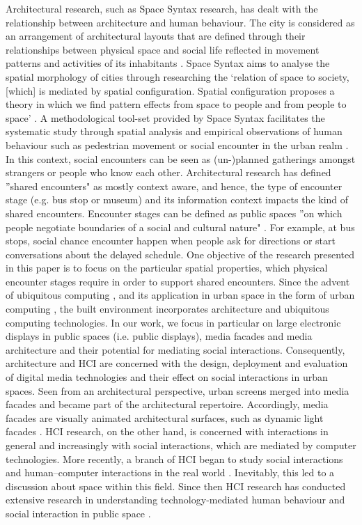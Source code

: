 Architectural research, such as Space Syntax research, has dealt with the relationship
between architecture and human behaviour. The city is considered as an
arrangement of architectural layouts that are defined through their relationships
between physical space and social life reflected in movement patterns and activities
of its inhabitants \cite{Hillier1984}. Space Syntax aims to analyse
the spatial morphology of cities through researching the ‘relation of space to society,
[which] is mediated by spatial configuration. Spatial configuration proposes
a theory in which we find pattern effects from space to people and from people
to space’ \cite{Hillier1998}. A methodological tool-set provided by Space
Syntax facilitates the systematic study through spatial analysis and empirical
observations of human behaviour such as pedestrian movement or social encounter
in the urban realm \cite{AlSayed2013}. In this context, social encounters
can be seen as (un-)planned gatherings amongst strangers or people who know
each other. Architectural research has defined ''shared encounters" as mostly context
aware, and hence, the type of encounter stage (e.g. bus stop or museum) and
its information context impacts the kind of shared encounters. Encounter stages
can be defined as public spaces ''on which people negotiate boundaries of a social
and cultural nature" \cite{Fatah2009}. For example, at bus
stops, social chance encounter happen when people ask for directions or start conversations
about the delayed schedule. One objective of the research presented in
this paper is to focus on the particular spatial properties, which physical encounter
stages require in order to support shared encounters.
Since the advent of ubiquitous computing \cite{Weiser1991}, and its application
in urban space in the form of urban computing \cite{Kindberg2007}, the built environment incorporates architecture and ubiquitous computing technologies.
In our work, we focus in particular on large electronic displays in public spaces
(i.e. public displays), media facades and media architecture and their potential for
mediating social interactions. Consequently, architecture and HCI are concerned
with the design, deployment and evaluation of digital media technologies and their
effect on social interactions in urban spaces. Seen from an architectural perspective,
urban screens merged into media facades and became part of the architectural
repertoire. Accordingly, media facades are visually animated architectural
surfaces, such as dynamic light facades \cite{Virilio1991} \cite{Fatah2006}
\cite{McQuire2009}.
HCI research, on the other hand, is concerned with interactions in general
and increasingly with social interactions, which are mediated by computer technologies.
More recently, a branch of HCI began to study social interactions and
human–computer interactions in the real world \cite{Rogers2011}. Inevitably, this led
to a discussion about space within this field. Since then HCI research has conducted
extensive research in understanding technology-mediated human behaviour
and social interaction in public space \cite{Fischer2012} \cite{Akpan2013}.



